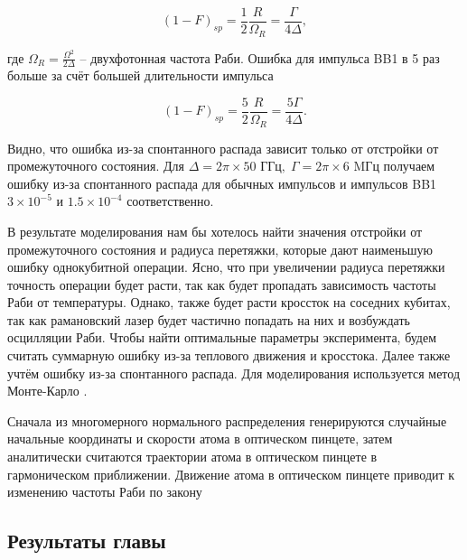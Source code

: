 \begin{equation}
	\left(1-F\right)_{sp}=\frac{1}{2}\frac{R}{\Omega_R}=\frac{\Gamma}{4\Delta},	
\end{equation}

где $\Omega_R=\frac{\Omega^2}{2\Delta}$ – двухфотонная частота Раби. Ошибка для импульса BB1 в 5 раз больше за счёт большей длительности импульса

\begin{equation}
	\left(1-F\right)_{sp}=\frac{5}{2}\frac{R}{\Omega_R}=\frac{5\Gamma}{4\Delta}.	
\end{equation}

Видно, что ошибка из-за спонтанного распада зависит только от отстройки от промежуточного состояния. Для $\Delta=2\pi\times 50 \text{ ГГц},\; \Gamma=2\pi \times 6 \text{ MГц}$ получаем ошибку из-за спонтанного распада для обычных импульсов и импульсов BB1 $3\times{10}^{-5}$ и $1.5\times{10}^{-4}$ соответственно.

В результате моделирования нам бы хотелось найти значения отстройки от промежуточного состояния и радиуса перетяжки, которые дают наименьшую ошибку однокубитной операции. Ясно, что при увеличении радиуса перетяжки точность операции будет расти, так как будет пропадать зависимость частоты Раби от температуры. Однако, также будет расти кроссток на соседних кубитах, так как рамановский лазер будет частично попадать на них и возбуждать осцилляции Раби. Чтобы найти оптимальные параметры эксперимента, будем считать суммарную ошибку из-за теплового движения и кросстока. Далее также учтём ошибку из-за спонтанного распада. 
Для моделирования используется метод Монте-Карло \begingroup\color{red}{Тут надо расписать подробно метод Монте-Карло}\endgroup.

Сначала из многомерного нормального распределения генерируются случайные начальные координаты и скорости атома в оптическом пинцете, затем аналитически считаются траектории атома в оптическом пинцете в гармоническом приближении. Движение атома в оптическом пинцете приводит к изменению частоты Раби по закону





\subsection{Результаты главы}

\newpage